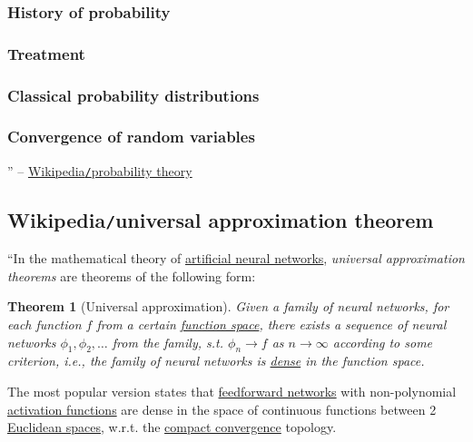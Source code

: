 \documentclass{article}
\newtheorem{theorem}{Theorem}
\begin{document}
\subsubsection{History of probability}

\subsubsection{Treatment}

\subsubsection{Classical probability distributions}

\subsubsection{Convergence of random variables}

'' -- \href{https://en.wikipedia.org/wiki/Probability_theory}{Wikipedia{\tt/}probability theory}


\subsection{Wikipedia{\tt/}universal approximation theorem}
``In the mathematical theory of \href{https://en.wikipedia.org/wiki/Artificial_neural_networks}{artificial neural networks}, {\it universal approximation theorems} are theorems of the following form:

\begin{theorem}[Universal approximation]
	Given a family of neural networks, for each function $f$ from a certain \href{https://en.wikipedia.org/wiki/Function_space}{function space}, there exists a sequence of neural networks $\phi_1,\phi_2,\ldots$ from the family, s.t. $\phi_n\to f$ as $n\to\infty$ according to some criterion, i.e., the family of neural networks is \href{https://en.wikipedia.org/wiki/Dense_set}{dense} in the function space.
\end{theorem}
The most popular version states that \href{https://en.wikipedia.org/wiki/Feedforward_neural_network}{feedforward networks} with non-polynomial \href{https://en.wikipedia.org/wiki/Activation_function}{activation functions} are dense in the space of continuous functions between 2 \href{https://en.wikipedia.org/wiki/Euclidean_space}{Euclidean spaces}, w.r.t. the \href{https://en.wikipedia.org/wiki/Compact_convergence}{compact convergence} topology.
\end{document}
